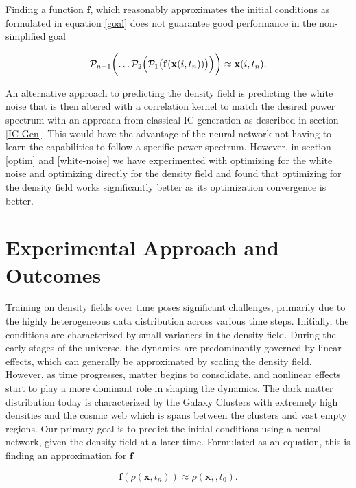 \documentclass{article}
\begin{document}
Finding a function \(\mathbf{f}\), which reasonably approximates the initial conditions as formulated in equation \ref{goal} does not guarantee good performance in the non-simplified goal

\begin{equation}
    \mathcal{P}_{n-1}\biggl( \dots \mathcal{P}_2\Bigl(\mathcal{P}_1\bigl(\mathbf{f}(\mathbf{x}(i, t_{n}))\bigr)\Bigr)\biggr) \approx \mathbf{x}(i, t_{n}).
\end{equation}

An alternative approach to predicting the density field is predicting the white noise that is then altered with a correlation kernel to match the desired power spectrum with an approach from classical IC generation as described in section \ref{IC-Gen}. This would have the advantage of the neural network not having to learn the capabilities to follow a specific power spectrum. However, in section \ref{optim} and \ref{white-noise} we have experimented with optimizing for the white noise and optimizing directly for the density field and found that optimizing for the density field works significantly better as its optimization convergence is better. 

\newpage
\section{Experimental Approach and Outcomes}
Training on density fields over time poses significant challenges, primarily due to the highly heterogeneous data distribution across various time steps. Initially, the conditions are characterized by small variances in the density field. During the early stages of the universe, the dynamics are predominantly governed by linear effects, which can generally be approximated by scaling the density field. However, as time progresses, matter begins to consolidate, and nonlinear effects start to play a more dominant role in shaping the dynamics. The dark matter distribution today is characterized by the Galaxy Clusters with extremely high densities and the cosmic web which is spans between the clusters and vast empty regions. Our primary goal is to predict the initial conditions using a neural network, given the density field at a later time. Formulated as an equation, this is finding an approximation for $\mathbf{f}$

\begin{equation}
    \mathbf{f}(\rho(\mathbf{x}, t_{n})) \approx \rho(\mathbf{x},, t_{0}).
\end{equation}
\end{document}
